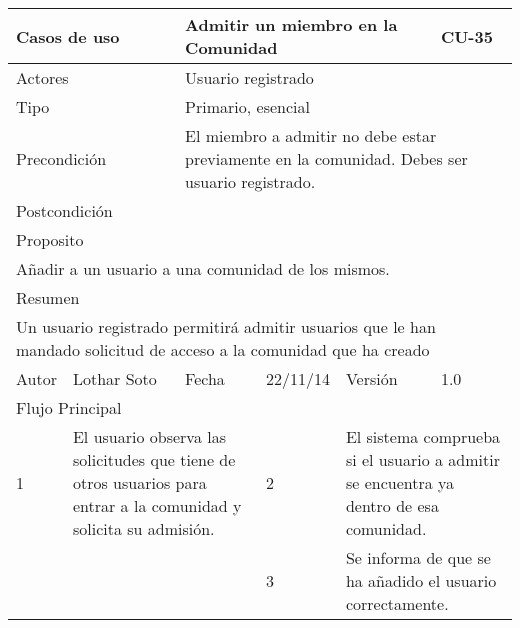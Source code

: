\documentclass{article}
\begin{document}
\begin{table}[h]
\begin{tabular}{|l|l|l|l|l|l|}
\hline
\multicolumn{2}{|p{2cm}|}{Casos de uso}  & \multicolumn{3}{p{7cm}|}{Admitir un miembro en la Comunidad} & CU-35 \\
\hline
\multicolumn{2}{|p{2cm}|}{Actores}       & \multicolumn{4}{p{8cm}|}{Usuario registrado}        \\
\hline
\multicolumn{2}{|p{2cm}|}{Tipo}          & \multicolumn{4}{p{8cm}|}{Primario, esencial}        \\
\hline
\multicolumn{2}{|p{2cm}|}{Precondición}  & \multicolumn{4}{p{8cm}|}{El miembro a admitir no debe estar previamente en la comunidad. Debes ser usuario registrado.}        \\
\hline
\multicolumn{2}{|p{2cm}|}{Postcondición} & \multicolumn{4}{p{8cm}|}{}        \\
\hline
\multicolumn{6}{|p{10cm}|}{Proposito}                                   \\
\hline
\multicolumn{6}{|p{10cm}|}{Añadir a un usuario a una comunidad de los mismos.}                                            \\
\hline
\multicolumn{6}{|p{10cm}|}{Resumen}                                 \\
\hline
\multicolumn{6}{|p{10cm}|}{Un usuario registrado permitirá admitir usuarios que le han mandado solicitud de acceso a la comunidad que ha creado}                                            \\
\hline
Autor         &       Lothar Soto        &  Fecha   &  22/11/14   &   Versión  & 1.0\\     
\hline
\multicolumn{6}{|p{10cm}|}{Flujo Principal}\\
\hline
\multicolumn{1}{|p{0.5cm}|}{1} & \multicolumn{2}{p{3cm}}{El usuario observa las solicitudes que tiene de otros usuarios para entrar a la comunidad y solicita su admisión.} & \multicolumn{1}{|p{0.5cm}|}{2} & \multicolumn{2}{p{3cm}|}{El sistema comprueba si el usuario a admitir se encuentra ya dentro de esa comunidad.}\\
\hline
\multicolumn{1}{|p{0.5cm}|}{} & \multicolumn{2}{p{3cm}}{} & \multicolumn{1}{|p{0.5cm}|}{3} & \multicolumn{2}{p{3cm}|}{Se informa de que se ha añadido el usuario correctamente.}\\
\hline


\end{tabular}
\end{table}
\end{document}
